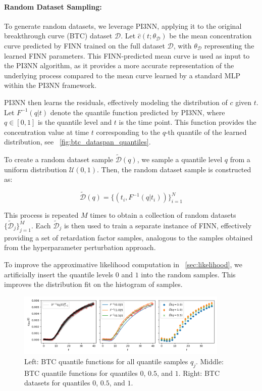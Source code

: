 \paragraph{Random Dataset Sampling:}
\label{sec:random_dataset_sampling}
To generate random datasets, we leverage PI3NN, applying it to the original breakthrough curve (BTC) dataset $\mathcal{D}$. Let $\hat{c}(t; \theta_{\mathcal{D}})$ be the mean concentration curve predicted by FINN trained on the full dataset $\mathcal{D}$, with $\theta_{\mathcal{D}}$ representing the learned FINN parameters. This FINN-predicted mean curve is used as input to the PI3NN algorithm, as it provides a more accurate representation of the underlying process compared to the mean curve learned by a standard MLP within the PI3NN framework.

PI3NN then learns the residuals, effectively modeling the distribution of $c$ given $t$. Let $F^{-1}(q | t)$ denote the quantile function predicted by PI3NN, where $q \in [0, 1]$ is the quantile level and $t$ is the time point. This function provides the concentration value at time $t$ corresponding to the $q$-th quantile of the learned distribution, see ~\vref{fig:btc_dataspan_quantiles}.

To create a random dataset sample $\tilde{\mathcal{D}}(q)$, we sample a quantile level $q$ from a uniform distribution $\mathcal{U}(0, 1)$. Then, the random dataset sample is constructed as:

$$
\tilde{\mathcal{D}}(q) = \{ (t_i, F^{-1}(q | t_i) ) \}_{i=1}^N
$$

This process is repeated $M$ times to obtain a collection of random datasets $\{\tilde{\mathcal{D}}_j\}_{j=1}^M$. Each $\tilde{\mathcal{D}}_j$ is then used to train a separate instance of FINN, effectively providing a set of retardation factor samples, analogous to the samples obtained from the hyperparameter perturbation approach.

To improve the approximative likelihood computation in ~\vref{sec:likelihood}, we artificially insert the quantile levels $0$ and $1$ into the random samples. This improves the distribution fit on the histogram of samples.

\begin{figure}
    \centering
    \includegraphics[width=0.9\textwidth]{figs/btc_dataspan_quantiles.png}
    \caption{Left: BTC quantile functions for all quantile samples $q_j$. Middle: BTC quantile functions for quantiles $0$, $0.5$, and $1$. Right: BTC datasets for quantiles $0$, $0.5$, and $1$.}
    \label{fig:btc_dataspan_quantiles}
\end{figure}



